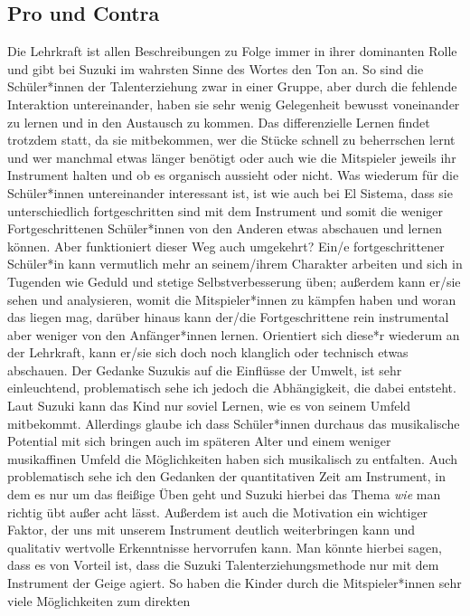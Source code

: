 \subsection{Pro und Contra}
Die Lehrkraft ist allen Beschreibungen zu Folge immer in ihrer dominanten Rolle
und gibt bei Suzuki im wahrsten Sinne des Wortes den Ton an. So sind die Schüler*innen
der Talenterziehung zwar in einer Gruppe, aber durch die fehlende Interaktion
untereinander, haben sie sehr wenig Gelegenheit bewusst voneinander zu lernen
und in den Austausch zu kommen. Das differenzielle Lernen findet trotzdem statt,
da sie mitbekommen, wer die Stücke schnell zu beherrschen lernt und wer manchmal
etwas länger benötigt oder auch wie die Mitspieler jeweils ihr Instrument halten
und ob es organisch aussieht oder nicht. Was wiederum für die Schüler*innen
untereinander interessant ist, ist wie auch bei El Sistema, dass sie
unterschiedlich fortgeschritten sind mit dem Instrument und somit die weniger
Fortgeschrittenen Schüler*innen von den Anderen etwas abschauen und lernen
können.
Aber funktioniert dieser Weg auch umgekehrt? Ein/e fortgeschrittener Schüler*in kann
vermutlich mehr an seinem/ihrem Charakter arbeiten und sich in Tugenden wie Geduld und
stetige Selbstverbesserung üben; außerdem kann er/sie sehen und analysieren, womit
die Mitspieler*innen zu kämpfen haben und woran das liegen mag, darüber hinaus kann
der/die Fortgeschrittene rein instrumental aber weniger von den Anfänger*innen
lernen. Orientiert sich diese*r wiederum an der Lehrkraft, kann er/sie sich doch
noch klanglich oder technisch etwas abschauen. Der Gedanke Suzukis auf die
Einflüsse der Umwelt, ist sehr einleuchtend, problematisch sehe ich jedoch die
Abhängigkeit, die dabei entsteht. Laut Suzuki kann das Kind nur soviel Lernen,
wie es von seinem Umfeld mitbekommt. Allerdings glaube ich dass Schüler*innen
durchaus das musikalische Potential mit sich bringen auch im späteren Alter und
einem weniger musikaffinen Umfeld die Möglichkeiten haben sich musikalisch zu
entfalten. Auch problematisch sehe ich den Gedanken der quantitativen Zeit am
Instrument, in dem es nur um das fleißige Üben geht und Suzuki hierbei das Thema
\emph{wie} man richtig übt außer acht lässt. Außerdem ist auch die Motivation
ein wichtiger Faktor, der uns mit unserem Instrument deutlich weiterbringen kann
und qualitativ wertvolle Erkenntnisse hervorrufen kann. Man könnte hierbei sagen, dass es von Vorteil ist, dass die Suzuki
Talenterziehungsmethode nur mit dem Instrument der Geige agiert. So haben die
Kinder durch die Mitspieler*innen sehr viele Möglichkeiten zum direkten
